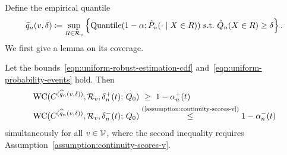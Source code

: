 Define the 
empirical quantile
\begin{align*}
  \widehat{q}_n(v, \delta) \coloneqq \sup_{R \in \mathcal{R}_v}
  \left\{\textup{Quantile}(1-\alpha; \hat{P}_n( \cdot \mid X \in R))
  ~ \mbox{s.t.}~
  \hat{Q}_n( X \in R) \ge \delta \right\}.
\end{align*}
We first give a lemma on its coverage.
\begin{lemma}
  \label{lemma:empirical-q-once-coverage}
  Let the bounds~\eqref{eqn:uniform-robust-estimation-cdf}
  and~\eqref{eqn:uniform-probability-events} hold. Then
  \begin{equation}
    \label{eqn:quantile-comparison-over-v}
    \begin{split}
      \textup{WC}(C^{(\widehat{q}_n(v, \delta))}, \mathcal{R}_v, \delta_{n}^{+}(t); \, Q_0)
      & ~ \ge ~ 1 - \alpha_{n}^{+}(t)  \\
      \textup{WC}(C^{(\widehat{q}_n(v, \delta))}, \mathcal{R}_v, \delta_{n}^{-}(t); \, Q_0)
      & \stackrel{(\textup{\ref{assumption:continuity-scores-v}})}{\le}
      1 - \alpha_{n}^{-}(t)
    \end{split}
  \end{equation}
  simultaneously for all $v \in \mathcal{V}$,
  where the second inequality requires
  Assumption~\ref{assumption:continuity-scores-v}.
\end{lemma}
